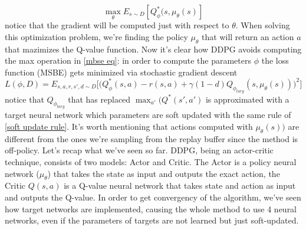 \documentclass[a4paper]{report}
\begin{document}
\begin{equation}
\max_{\theta}E_{s \sim D}[Q_{\phi}^*(s,\mu_{\theta}(s)]
\end{equation}
notice that the gradient will be computed just with respect to $\theta$. When solving this optimization problem, we're finding the policy $\mu_{\theta}$ that will return an action $a$ that mazimizes the Q-value function. Now it's clear how DDPG avoids computing the max operation in \ref{mbse eq}: in order to compute the parameters $\phi$ the loss function (MSBE) gets minimized via stochastic gradient descent
\begin{equation}
L(\phi, \textit{D}) = E_{s,a,r,s',d \sim \textit{D}}\biggl[\bigl(Q_{\phi}^{*}(s,a) - r(s,a) + \gamma(1-d) Q_{\phi_{targ}}(s, \mu_{\theta}(s))
\bigr)^2
\biggr]
\end{equation}
notice that $Q_{\phi_{targ}}$ that has replaced $ \max_{a'}(Q^*(s',a')$ is approximated with a target neural network which parameters are soft updated 
with the same rule of \ref{soft update rule}. It's worth mentioning that actions computed with $\mu_{\theta}(s))$ are different from the ones we're sampling from the replay buffer since the method is off-policy. Let's recap what we've seen so far. DDPG, being an actor-critic technique, consists of two models: Actor and Critic. The Actor is a policy neural network ($\mu_{\theta} $) that takes the state as input and outputs the exact action, the Critic $Q(s,a)$ is a Q-value neural network that takes state and action as input and outputs the Q-value. In order to get convergency of the algorithm, we've seen how target networks are implemented, causing the whole method to use 4 neural networks, even if the parameters of targets are not learned but just soft-updated.
\end{document}
